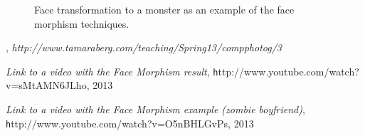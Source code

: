 \documentclass[11pt]{article}
\begin{document}
\begin{figure}[H]
\begin{center}
\caption{Face transformation to a monster as an example of the face morphism techniques.}
\label{zombie}
\end{center}
\end{figure}





\newpage





\begin{thebibliography}{}

, {\it http://www.tamaraberg.com/teaching/Spring13/compphotog/3}

 {\it Link to a video with the Face Morphism result}, {\texttt http://www.youtube.com/watch?v=sMtAMN6JLho}, 2013

 {\it Link to a video with the Face Morphism example (zombie boyfriend)}, {\texttt http://www.youtube.com/watch?v=O5nBHLGvPs}, 2013

\end{thebibliography}
\end{document}

